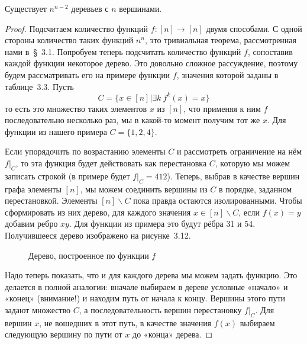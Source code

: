 \begin{thm}
Существует $n^{n-2}$ деревьев с $n$ вершинами.
\end{thm}
\begin{proof}
Подсчитаем количество функций $f:[n]\to[n]$ двумя способами. С одной стороны количество таких функций $n^n$, это тривиальная теорема, рассмотренная нами в~\S~3.1. Попробуем теперь подсчитать количество функций $f$, сопоставив каждой функции некоторое дерево. Это довольно сложное рассуждение, поэтому будем рассматривать его на примере функции $f$, значения которой заданы в таблице~3.3. Пусть
$$C = \{x \in[n]| \exists k\ f^k(x) = x\}$$
то есть это множество таких элементов $x$ из $[n]$, что применяя к ним $f$ последовательно несколько раз, мы в какой-то момент получим тот же $x$. Для функции из нашего примера $C = \{1,2,4\}$.

Если упорядочить по возрастанию элементы $C$ и рассмотреть ограничение на нём $f|_C$, то эта функция будет действовать как перестановка $C$, которую мы можем записать строкой (в примере будет $f|_C = 412$). Теперь, выбрав в качестве вершин графа элементы $[n]$, мы можем соединить вершины из $C$ в порядке, заданном перестановкой. Элементы $[n]\backslash C$ пока правда остаются изолированными. Чтобы сформировать из них дерево, для каждого значения $x\in [n]\backslash C$, если $f(x)=y$ добавим ребро $xy$. Для функции из примера это будут рёбра 31 и 54. Получившееся дерево изображено на рисунке~3.12.

\begin{figure}[h]
\centering
{}
\caption{Дерево, построенное по функции $f$}
\end{figure}

Надо теперь показать, что и для каждого дерева мы можем задать функцию. Это делается в полной аналогии: вначале выбираем в дереве условные «начало» и «конец» (внимание!) и находим путь от начала к концу. Вершины этого пути задают множество $C$, а последовательность вершин перестановку $f|_C$. Для вершин $x$, не вошедших в этот путь, в качестве значения $f(x)$ выбираем следующую вершину по пути от $x$ до «конца» дерева.


\end{proof}
